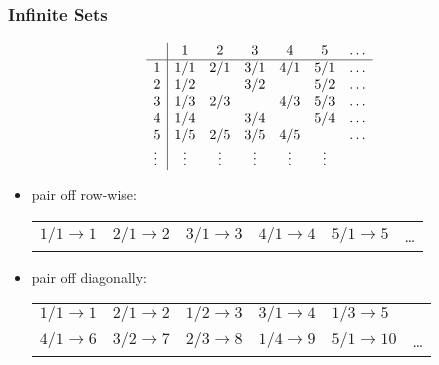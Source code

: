 \documentclass[dvipsnames]{beamer}
\begin{document}
\begin{frame}
  \frametitle{Infinite Sets}

  \begin{footnotesize}
  \begin{example}[$|\mathbb{Z}^+| \stackrel{?}{=} |\mathbb{Q}|$]
    \[
    \begin{array}{l|ccccccc|}
             &  $1$   &  $2$   &  $3$   &  $4$   &  $5$   & \ldots\\\hline
      $1$    & $1/1$  & $2/1$  & $3/1$  & $4/1$  & $5/1$  & \ldots\\
      $2$    & $1/2$  &        & $3/2$  &        & $5/2$  & \ldots\\
      $3$    & $1/3$  & $2/3$  &        & $4/3$  & $5/3$  & \ldots\\
      $4$    & $1/4$  &        & $3/4$  &        & $5/4$  & \ldots\\
      $5$    & $1/5$  & $2/5$  & $3/5$  & $4/5$  &        & \ldots\\
      \vdots & \vdots & \vdots & \vdots & \vdots & \vdots &
    \end{array}
    \]

    \begin{itemize}
      \item pair off row-wise:\\
      \begin{tabular}{llllll}
        $1/1 \rightarrow 1$ & $2/1 \rightarrow 2$ & $3/1 \rightarrow 3$
                            & $4/1 \rightarrow 4$ & $5/1 \rightarrow 5$ & \ldots\\
      \end{tabular}

      \pause
      \item pair off diagonally:\\
      \begin{tabular}{llllll}
        $1/1 \rightarrow 1$ & $2/1 \rightarrow 2$ & $1/2 \rightarrow 3$
                            & $3/1 \rightarrow 4$ & $1/3 \rightarrow 5$ & \\
        $4/1 \rightarrow 6$ & $3/2 \rightarrow 7$ & $2/3 \rightarrow 8$
                            & $1/4 \rightarrow 9$ & $5/1 \rightarrow 10$ & \ldots
      \end{tabular}
    \end{itemize}
  \end{example}
  \end{footnotesize}
\end{frame}
\end{document}
